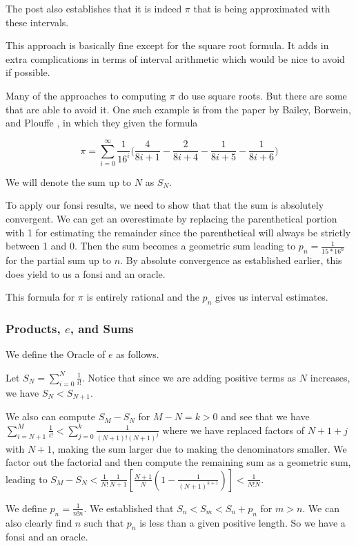 \documentclass[12pt]{article}
\theoremstyle{remark}
\begin{document}
The post also establishes that it is indeed $\pi$ that is being approximated with these intervals.

This approach is basically fine except for the square root formula. It adds in extra complications in terms of interval arithmetic which would be nice to avoid if possible. 

Many of the approaches to computing $\pi$ do use square roots. But there are some that are able to avoid it. One such example is from the paper by Bailey, Borwein, and Plouffe \cite{BBP}, in which they given the formula 

\[ 
\pi = \sum_{i=0}^\infty \frac{1}{16^i} \bigg( \frac{4}{8i+1} - \frac{2}{8i+4} - \frac{1}{8i+5} - \frac{1}{8i+6} \bigg)
\]

We will denote the sum up to $N$ as $S_N$.

To apply our fonsi results, we need to show that that the sum is absolutely convergent. We can get an overestimate by replacing the parenthetical portion with 1 for estimating the remainder since the parenthetical will always be strictly between 1 and 0. Then the sum becomes a geometric sum leading to $p_n = \frac{1}{15*16^n}$ for the partial sum up to $n$. By absolute convergence as established earlier, this does yield to us a fonsi and an oracle.  

This formula for $\pi$ is entirely rational and the $p_n$ gives us interval estimates.

\subsubsection{Products, $e$, and Sums}\label{sec:e}

We define the Oracle of $e$ as follows. 

Let $S_N = \sum_{i=0}^N \frac{1}{i!}$. Notice that since we are adding positive terms as $N$ increases, we have $S_N < S_{N+1}$. 

We also can compute $S_M - S_N$ for $M - N = k > 0$ and see that we have $\sum_{i=N+1}^M \frac{1}{i!} <  \sum_{j=0}^k  \frac{1}{(N+1)!(N+1)^j} $ where we have replaced factors of $N+1 + j$ with $N+1$, making the sum larger due to making the denominators smaller. We factor out the factorial and then compute the remaining sum as a geometric sum, leading to $S_M - S_N < \frac{1}{N!} \frac{1}{N+1} [\frac{N+1}{N} (1 - \frac{1}{(N+1)^{k+1}} )] < \frac{1}{N! N}$.

We define $p_n = \frac{1}{n!n}$. We established that $S_n < S_m < S_n + p_n$ for $m> n$. We can also clearly find $n$ such that $p_n$ is less than a given positive length. So we have a fonsi and an oracle. 
\end{document}

